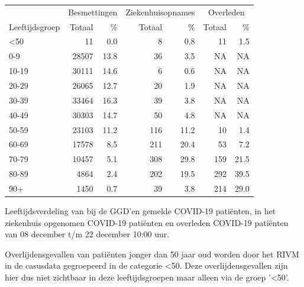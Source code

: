 \documentclass[
  english,
  man,floatsintext]{apa6}
\begin{document}
\begin{table}
\centering\begingroup\fontsize{11}{13}\selectfont

\begin{threeparttable}
\begin{tabular}{lrrrrrr}
\toprule
\multicolumn{1}{c}{ } & \multicolumn{2}{c}{Besmettingen} & \multicolumn{2}{c}{Ziekenhuisopnames} & \multicolumn{2}{c}{Overleden} \\
\cmidrule(l{3pt}r{3pt}){2-3} \cmidrule(l{3pt}r{3pt}){4-5} \cmidrule(l{3pt}r{3pt}){6-7}
Leeftijdsgroep & Totaal & \% & Totaal & \% & Totaal & \%\\
\midrule
<50 & 11 & 0.0 & 8 & 0.8 & 11 & 1.5\\
0-9 & 28507 & 13.8 & 36 & 3.5 & NA & NA\\
10-19 & 30111 & 14.6 & 6 & 0.6 & NA & NA\\
20-29 & 26065 & 12.7 & 20 & 1.9 & NA & NA\\
30-39 & 33464 & 16.3 & 39 & 3.8 & NA & NA\\
40-49 & 30303 & 14.7 & 50 & 4.8 & NA & NA\\
50-59 & 23103 & 11.2 & 116 & 11.2 & 10 & 1.4\\
60-69 & 17578 & 8.5 & 211 & 20.4 & 53 & 7.2\\
70-79 & 10457 & 5.1 & 308 & 29.8 & 159 & 21.5\\
80-89 & 4864 & 2.4 & 202 & 19.5 & 292 & 39.5\\
90+ & 1450 & 0.7 & 39 & 3.8 & 214 & 29.0\\
\bottomrule
\end{tabular}
\begin{tablenotes}
\item[1] Leeftijdsverdeling van bij de GGD’en gemelde COVID-19 patiënten, in het ziekenhuis opgenomen COVID-19 patiënten en overleden COVID-19 patiënten van 08 december t/m 22 december 10:00 uur.
\item[2] Overlijdensgevallen van patiënten jonger dan 50 jaar oud worden door het RIVM in de casusdata gegroepeerd in de categorie <50. Deze overlijdensgevallen zijn hier dus niet zichtbaar in deze leeftijdsgroepen maar alleen via de groep '<50'.
\end{tablenotes}
\end{threeparttable}
\endgroup{}
\end{table}

\newpage
\end{document}
